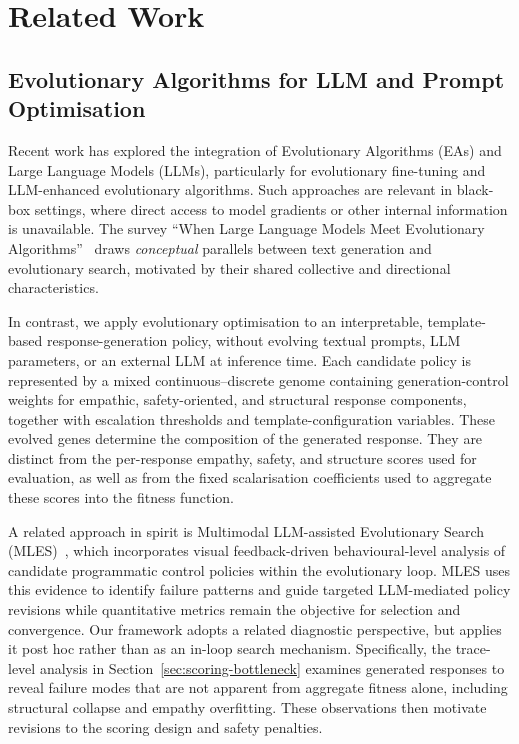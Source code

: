\documentclass[mathematics,article,submit,xetex,moreauthors]{Definitions/mdpi}
\begin{document}
\section{Related Work}
\label{sec:related}

\subsection{Evolutionary Algorithms for LLM and Prompt Optimisation}

Recent work has explored the integration of Evolutionary Algorithms (EAs) and
Large Language Models (LLMs), particularly for evolutionary fine-tuning and
LLM-enhanced evolutionary algorithms. Such approaches are relevant in
black-box settings, where direct access to model gradients or other internal
information is unavailable. The survey ``When Large Language Models Meet
Evolutionary Algorithms''~\cite{when_llms_meet_ea2025} draws \emph{conceptual}
parallels between text generation and evolutionary search, motivated by their
shared collective and directional characteristics. 

In contrast, we apply evolutionary optimisation to an interpretable,
template-based response-generation policy, without evolving textual prompts,
LLM parameters, or an external LLM at inference time. Each candidate policy is
represented by a mixed continuous--discrete genome containing generation-control
weights for empathic, safety-oriented, and structural response components,
together with escalation thresholds and template-configuration variables. These
evolved genes determine the composition of the generated response. They are
distinct from the per-response empathy, safety, and structure scores used for
evaluation, as well as from the fixed scalarisation coefficients used to
aggregate these scores into the fitness function.

A related approach in spirit is Multimodal LLM-assisted Evolutionary Search (MLES)~\cite{mles2026}, which incorporates visual feedback-driven behavioural-level analysis of
candidate programmatic control policies within the evolutionary loop. MLES uses
this evidence to identify failure patterns and guide targeted LLM-mediated
policy revisions while quantitative metrics remain the objective for selection
and convergence.
Our framework adopts a related diagnostic perspective, but applies it
post hoc rather than as an in-loop search mechanism. Specifically, the
trace-level analysis in Section~\ref{sec:scoring-bottleneck} examines generated
responses to reveal failure modes that are not apparent from aggregate fitness
alone, including structural collapse and empathy overfitting. These observations
then motivate revisions to the scoring design and safety penalties.
\end{document}
